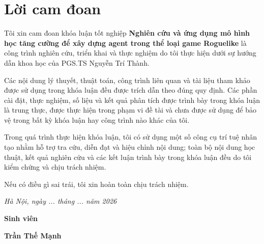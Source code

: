 \clearpage
\chapter*{Lời cam đoan}
{}

Tôi xin cam đoan khóa luận tốt nghiệp \textbf{Nghiên cứu và ứng dụng mô hình học tăng cường để xây dựng agent trong thể loại game Roguelike} là công trình nghiên cứu, triển khai và thực nghiệm do tôi thực hiện dưới sự hướng dẫn khoa học của PGS.TS Nguyễn Trí Thành.

Các nội dung lý thuyết, thuật toán, công trình liên quan và tài liệu tham khảo được sử dụng trong khóa luận đều được trích dẫn theo đúng quy định. Các phần cài đặt, thực nghiệm, số liệu và kết quả phân tích được trình bày trong khóa luận là trung thực, được thực hiện trong phạm vi đề tài và chưa được sử dụng để bảo vệ trong bất kỳ khóa luận hay công trình nào khác của tôi.

Trong quá trình thực hiện khóa luận, tôi có sử dụng một số công cụ trí tuệ nhân tạo nhằm hỗ trợ tra cứu, diễn đạt và hiệu chỉnh nội dung; toàn bộ nội dung học thuật, kết quả nghiên cứu và các kết luận trình bày trong khóa luận đều do tôi kiểm chứng và chịu trách nhiệm.

Nếu có điều gì sai trái, tôi xin hoàn toàn chịu trách nhiệm.

\vspace{1cm}
\hspace{7cm}\textit{Hà Nội, ngày ... tháng ... năm 2026}

\hspace{9.4cm}\textbf{Sinh viên}
\vspace{2.5cm}


\hspace{8.85cm}\textbf{Trần Thế Mạnh}

